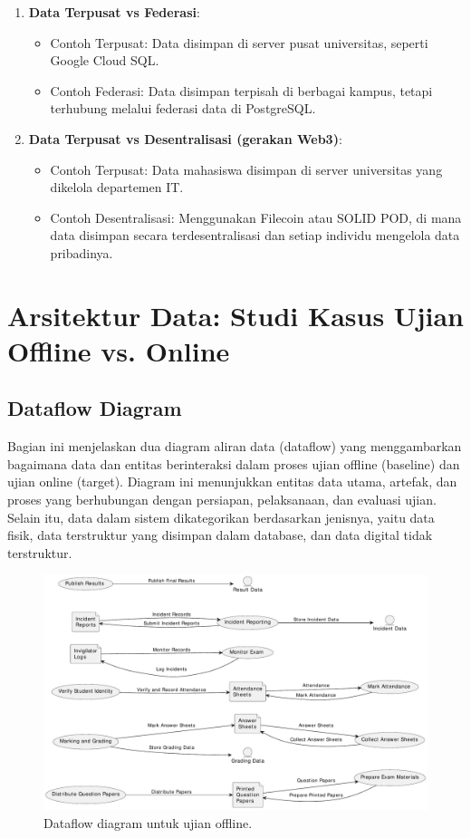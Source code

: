 \begin{enumerate}
	\item \textbf{Data Terpusat vs Federasi}: 
	\begin{itemize}
		\item Contoh Terpusat: Data disimpan di server pusat universitas, seperti Google Cloud SQL.
		\item Contoh Federasi: Data disimpan terpisah di berbagai kampus, tetapi terhubung melalui federasi data di PostgreSQL.
	\end{itemize}
	
	\item \textbf{Data Terpusat vs Desentralisasi (gerakan Web3)}: 
	\begin{itemize}
		\item Contoh Terpusat: Data mahasiswa disimpan di server universitas yang dikelola departemen IT.
		\item Contoh Desentralisasi: Menggunakan Filecoin atau SOLID POD, di mana data disimpan secara terdesentralisasi dan setiap individu mengelola data pribadinya.
	\end{itemize}
\end{enumerate}


\section{Arsitektur Data: Studi Kasus Ujian Offline vs. Online}

\subsection{Dataflow Diagram}

Bagian ini menjelaskan dua diagram aliran data (dataflow) yang menggambarkan bagaimana data dan entitas berinteraksi dalam proses ujian offline (baseline) dan ujian online (target). Diagram ini menunjukkan entitas data utama, artefak, dan proses yang berhubungan dengan persiapan, pelaksanaan, dan evaluasi ujian. Selain itu, data dalam sistem dikategorikan berdasarkan jenisnya, yaitu data fisik, data terstruktur yang disimpan dalam database, dan data digital tidak terstruktur.

\begin{figure}[th!]
	\centering
	\includegraphics[width=\linewidth]{../figures/dataflow_offline_exam}
	\caption{Dataflow diagram untuk ujian offline.}
	\label{fig:dataflow_offline_exam}
\end{figure}




